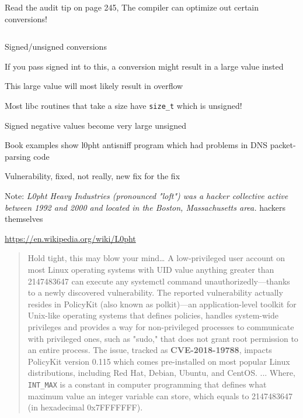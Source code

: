 \documentclass[Screen16to9,17pt]{foils}
\begin{document}
Read the audit tip on page 245, The compiler can optimize out certain conversions!




\inputminted{c}{programs/conversion1.c}

\begin{list2}
\item Signed/unsigned conversions
\item If you pass signed int to this, a conversion might result in a large value insted
\item This large value will most likely result in overflow
\item Most libc routines that take a size have \verb+size_t+ which is unsigned!
\item Signed negative values become very large unsigned
\end{list2}






\begin{list2}
\item Book examples show l0pht antisniff program which had problems in DNS packet-parsing code
\item Vulnerability, fixed, not really, new fix for the fix
\item Note: \emph{L0pht Heavy Industries (pronounced "loft") was a hacker collective active between 1992 and 2000 and located in the Boston, Massachusetts area. } hackers themselves \smiley
\item \url{https://en.wikipedia.org/wiki/L0pht}
\end{list2}





\begin{quote}
Hold tight, this may blow your mind…
A low-privileged user account on most Linux operating systems with UID value anything greater than 2147483647 can execute any systemctl command unauthorizedly—thanks to a newly discovered vulnerability.
The reported vulnerability actually resides in PolicyKit (also known as polkit)—an application-level toolkit for Unix-like operating systems that defines policies, handles system-wide privileges and provides a way for non-privileged processes to communicate with privileged ones, such as "sudo," that does not grant root permission to an entire process.
The issue, tracked as {\bf CVE-2018-19788}, impacts PolicyKit version 0.115 which comes pre-installed on most popular Linux distributions, including Red Hat, Debian, Ubuntu, and CentOS.
...
Where, \verb+INT_MAX+ is a constant in computer programming that defines what maximum value an integer variable can store, which equals to 2147483647 (in hexadecimal 0x7FFFFFFF).
\end{quote}
\end{document}
